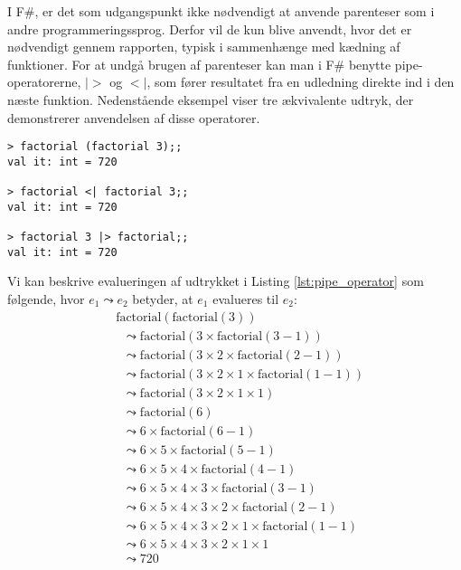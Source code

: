 I F\#, er det som udgangspunkt ikke nødvendigt at anvende parenteser som i andre programmeringssprog. Derfor vil de kun blive anvendt, hvor det er nødvendigt gennem rapporten, typisk i sammenhænge med kædning af funktioner. For at undgå brugen af parenteser kan man i F\# benytte pipe-operatorerne, $|>$ og $<|$, som fører resultatet fra en udledning direkte ind i den næste funktion. Nedenstående eksempel viser tre ækvivalente udtryk, der demonstrerer anvendelsen af disse operatorer.

\begin{lstlisting}[style=output, label={lst:pipe_operator}, caption={Eksempel på anvendelse af pipe-operatorer i F\# ved udregning af $(3!)! = 6! = 720 $.}]
> factorial (factorial 3);;
val it: int = 720

> factorial <| factorial 3;;
val it: int = 720

> factorial 3 |> factorial;;
val it: int = 720
\end{lstlisting}

Vi kan beskrive evalueringen af udtrykket i Listing \ref{lst:pipe_operator} som følgende, hvor $e_1 \leadsto e_2$ betyder, at $e_1$ evalueres til $e_2$:
\[
\begin{aligned}
&\text{factorial}(\text{factorial}(3)) \\
&\;\;\leadsto \text{factorial}(3 \times \text{factorial}(3 - 1)) \\
&\;\;\leadsto \text{factorial}(3 \times 2 \times \text{factorial}(2 - 1)) \\
&\;\;\leadsto \text{factorial}(3 \times 2 \times 1 \times \text{factorial}(1 - 1)) \\
&\;\;\leadsto \text{factorial}(3 \times 2 \times 1 \times 1) \\
&\;\;\leadsto \text{factorial}(6) \\
&\;\;\leadsto 6 \times \text{factorial}(6 - 1) \\
&\;\;\leadsto 6 \times 5 \times \text{factorial}(5 - 1) \\
&\;\;\leadsto 6 \times 5 \times 4 \times \text{factorial}(4 - 1) \\
&\;\;\leadsto 6 \times 5 \times 4 \times 3 \times \text{factorial}(3 - 1) \\
&\;\;\leadsto 6 \times 5 \times 4 \times 3 \times 2 \times \text{factorial}(2 - 1) \\
&\;\;\leadsto 6 \times 5 \times 4 \times 3 \times 2 \times 1 \times \text{factorial}(1 - 1) \\
&\;\;\leadsto 6 \times 5 \times 4 \times 3 \times 2 \times 1 \times 1 \\
&\;\;\leadsto 720
\end{aligned}
\]


